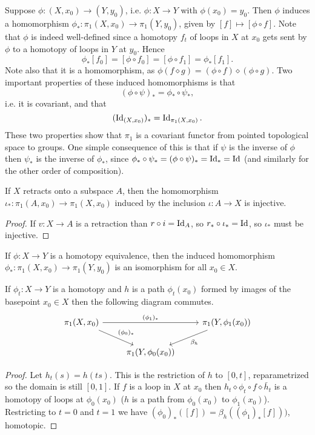 \documentclass{../mathnotes}
\begin{document}
Suppose $\phi:(X,x_0)\to (Y,y_0)$, i.e. $\phi:X\to Y$ with $\phi(x_0)=y_0$. Then $\phi$ induces
a homomorphism $\phi_*:\pi_1(X,x_0)\to\pi_1(Y,y_0)$, given by $[f]\mapsto [\phi\circ f]$. Note
that $\phi$ is indeed well-defined since a homotopy $f_t$ of loops in $X$ at $x_0$ gets sent
by $\phi$ to a homotopy of loops in $Y$ at $y_0$. Hence
\[\phi_*[f_0]=[\phi\circ f_0]=[\phi\circ f_1]=\phi_*[f_1].\]
Note also that it is a homomorphism, as $\phi(f\diamond g)=(\phi\circ f)\diamond(\phi\circ g)$.
Two important properties of these induced homomorphisms is that
\[ (\phi\circ\psi)_*=\phi_*\circ\psi_*,\]
i.e. it is covariant, and that
\[(\operatorname{Id}_{(X,x_0)})_*=\operatorname{Id}_{\pi_1(X,x_0)}.\]
These two properties show that $\pi_1$ is a covariant functor from pointed topological space to groups.
One simple consequence of this is that if $\psi$ is the inverse of $\phi$ then $\psi_*$ is the inverse
of $\phi_*$, since $\phi_*\circ\psi_*=(\phi\circ\psi)_*=\operatorname{Id}_*=\operatorname{Id}$ (and similarly for the other order
of composition).

\begin{prop}
    If $X$ retracts onto a subspace $A$, then the homomorphism $\iota_*:\pi_1(A,x_0)\to\pi_1(X,x_0)$
    induced by the inclusion $\iota:A\to X$ is injective.
\end{prop}
\begin{proof}
    If $v:X\to A$ is a retraction than $r\circ i=\operatorname{Id}_A$, so $r_*\circ \iota_*=\operatorname{Id}$, so $\iota_*$
    must be injective.
\end{proof}

\begin{prop}
    If $\phi:X\to Y$ is a homotopy equivalence, then the induced homomorphism $\phi_*:\pi_1(X,x_0)\to\pi_1(Y,y_0)$
    is an isomorphism for all $x_0\in X$.
\end{prop}

\begin{lem}
    If $\phi_t:X\to Y$ is a homotopy and $h$ is a path $\phi_t(x_0)$ formed by images of the basepoint
    $x_0\in X$ then the following diagram commutes.
    \begin{equation*}
        \begin{tikzcd}
            \pi_1(X,x_0)\arrow{rr}{(\phi_1)_*}\arrow{rd}{(\phi_0)_*}&&\pi_1(Y,\phi_1(x_0))\arrow{ld}{\beta_h}\\
            &\pi_1(Y,\phi_0(x_0))&
        \end{tikzcd}
    \end{equation*}
\end{lem}
\begin{proof}
    Let $h_t(s)=h(ts)$. This is the restriction of $h$ to $[0,t]$, reparametrized so the domain is still
    $[0,1]$. If $f$ is a loop in $X$ at $x_0$ then $h_t\diamond\phi_t\circ f\diamond \bar h_t$ is a
    homotopy of loops at $\phi_0(x_0)$ ($h$ is a path from $\phi_0(x_0)$ to $\phi_1(x_0)$). Restricting
    to $t=0$ and $t=1$ we have $(\phi_0)_*([f])=\beta_h\left( (\phi_1)_*[f] \right))$, homotopic.
\end{proof}
\end{document}
